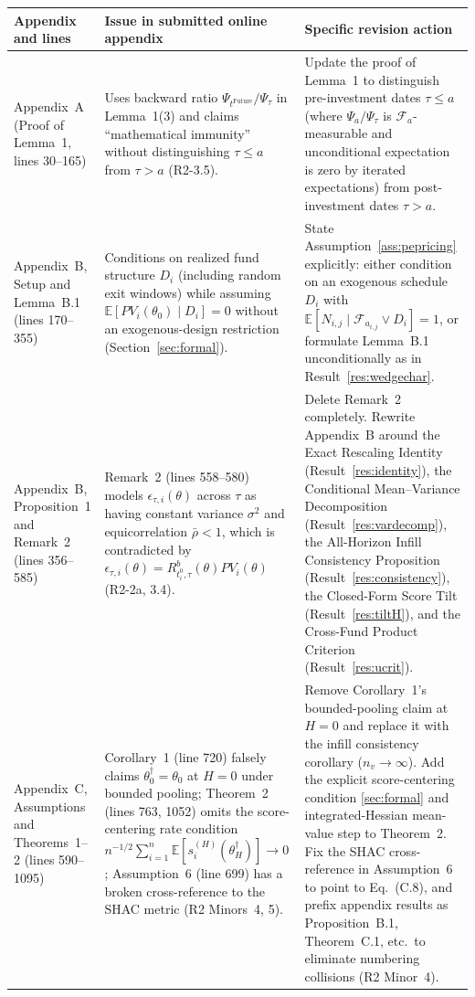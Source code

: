 \documentclass[11pt]{article}
\newcommand{\E}{\mathbb{E}}
\theoremstyle{plain}
\theoremstyle{definition}
\begin{document}
{\small
\begin{longtable}{@{}L{3.5cm}L{4.8cm}L{7.0cm}@{}}
\toprule
Appendix and lines & Issue in submitted online appendix & Specific revision action\\
\midrule
\endhead
Appendix~A (Proof of Lemma~1, lines 30--165) & Uses backward ratio $\Psi_{t^{\mathrm{Future}}}/\Psi_\tau$ in Lemma~1(3) and claims ``mathematical immunity'' without distinguishing $\tau\le a$ from $\tau>a$ (R2-3.5). & Update the proof of Lemma~1 to distinguish pre-investment dates $\tau\le a$ (where $\Psi_a/\Psi_\tau$ is $\mathcal F_a$-measurable and unconditional expectation is zero by iterated expectations) from post-investment dates $\tau>a$.\\
Appendix~B, Setup and Lemma~B.1 (lines 170--355) & Conditions on realized fund structure $D_i$ (including random exit windows) while assuming $\E[PV_i(\theta_0)\mid D_i]=0$ without an exogenous-design restriction (Section~\ref{sec:formal}). & State Assumption~\ref{ass:pepricing} explicitly: either condition on an exogenous schedule $D_i$ with $\E[N_{i,j}\mid\mathcal F_{a_{i,j}}\vee D_i]=1$, or formulate Lemma~B.1 unconditionally as in Result~\ref{res:wedgechar}.\\
Appendix~B, Proposition~1 and Remark~2 (lines 356--585) & Remark~2 (lines 558--580) models $\epsilon_{\tau,i}(\theta)$ across $\tau$ as having constant variance $\sigma^2$ and equicorrelation $\bar\rho<1$, which is contradicted by $\epsilon_{\tau,i}(\theta)=R^b_{t_i^0,\tau}(\theta)PV_i(\theta)$ (R2-2a, 3.4). & Delete Remark~2 completely. Rewrite Appendix~B around the Exact Rescaling Identity (Result~\ref{res:identity}), the Conditional Mean--Variance Decomposition (Result~\ref{res:vardecomp}), the All-Horizon Infill Consistency Proposition (Result~\ref{res:consistency}), the Closed-Form Score Tilt (Result~\ref{res:tiltH}), and the Cross-Fund Product Criterion (Result~\ref{res:ucrit}).\\
Appendix~C, Assumptions and Theorems~1--2 (lines 590--1095) & Corollary~1 (line 720) falsely claims $\theta_0^\dagger=\theta_0$ at $H=0$ under bounded pooling; Theorem~2 (lines 763, 1052) omits the score-centering rate condition $n^{-1/2}\sum_{i=1}^n\E[s_i^{(H)}(\theta_H^\dagger)]\to 0$; Assumption~6 (line 699) has a broken cross-reference to the SHAC metric (R2 Minors~4, 5). & Remove Corollary~1's bounded-pooling claim at $H=0$ and replace it with the infill consistency corollary ($n_v\to\infty$). Add the explicit score-centering condition \eqref{sec:formal} and integrated-Hessian mean-value step to Theorem~2. Fix the SHAC cross-reference in Assumption~6 to point to Eq.~(C.8), and prefix appendix results as Proposition~B.1, Theorem~C.1, etc.\ to eliminate numbering collisions (R2 Minor~4).\\

\end{longtable}}
\end{document}
